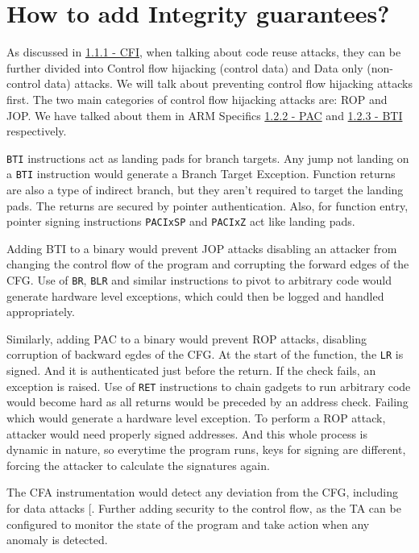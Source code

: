 \documentclass[a4paper, nobind]{templates/ociamthesis}
\begin{document}
\section{How to add Integrity guarantees?}\label{adding-integrity}

As discussed in \hyperref[cfi]{1.1.1 - CFI}, when talking about code reuse attacks, they can be further divided into
Control flow hijacking (control data) and Data only (non-control data) attacks.
We will talk about preventing control flow hijacking attacks first.
The two main categories of control flow hijacking attacks are: ROP and JOP.
We have talked about them in ARM Specifics \hyperref[pac-bg]{1.2.2 - PAC} and \hyperref[bti-bg]{1.2.3 - BTI} respectively.

\texttt{BTI} instructions act as landing pads for branch targets. Any jump not landing on a \texttt{BTI}
instruction would generate a Branch Target Exception. Function returns are also a
type of indirect branch, but they aren't required to target the landing pads.
The returns are secured by pointer authentication.
Also, for function entry, pointer signing instructions \texttt{PACIxSP} and \texttt{PACIxZ} act like
landing pads.

Adding BTI to a binary would prevent JOP attacks disabling an attacker from changing
the control flow of the program and corrupting the forward edges of the CFG.
Use of \texttt{BR}, \texttt{BLR} and similar instructions to pivot to arbitrary code would generate hardware
level exceptions, which could then be logged and handled appropriately.

Similarly, adding PAC to a binary would prevent ROP attacks, disabling corruption
of backward egdes of the CFG.
At the start of the function, the \texttt{LR} is signed. And it is authenticated just
before the return. If the check fails, an exception is raised.
Use of \texttt{RET} instructions to chain gadgets to run arbitrary code would become hard
as all returns would be preceded by an address check. Failing which would generate
a hardware level exception. To perform a ROP attack, attacker would need properly
signed addresses. And this whole process is dynamic in nature, so everytime the
program runs, keys for signing are different, forcing the attacker to calculate the
signatures again.

The CFA instrumentation would detect any deviation from the CFG, including for
data attacks {[}\citeproc{ref-blast}{56}{]}. Further adding security to the control flow, as the TA can be
configured to monitor the state of the program and take action when any anomaly
is detected.
\end{document}
